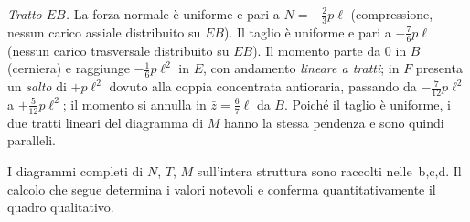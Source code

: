 \medskip
\noindent\textit{Tratto $EB$.}
La forza normale è uniforme e pari a
$N = -\tfrac{2}{3}p\ell$ (compressione, nessun carico
assiale distribuito su $EB$).
Il taglio è uniforme e pari a $-\tfrac{7}{6}p\ell$
(nessun carico trasversale distribuito su $EB$).
Il momento parte da $0$ in $B$ (cerniera)
e raggiunge $-\tfrac{1}{6}p\ell^2$ in $E$,
con andamento \emph{lineare a tratti}; in $F$
presenta un \emph{salto} di $+p\ell^2$ dovuto
alla coppia concentrata antioraria, passando
da $-\tfrac{7}{12}p\ell^2$ a $+\tfrac{5}{12}p\ell^2$;
il momento si annulla in $\bar{z} = \tfrac{6}{7}\ell$
da $B$. Poiché il taglio è uniforme, i due tratti
lineari del diagramma di $M$ hanno la stessa pendenza
e sono quindi paralleli.

I diagrammi completi di $N$, $T$, $M$ sull'intera
struttura sono raccolti nelle \,b,c,d.
Il calcolo che segue determina i valori notevoli
e conferma quantitativamente il quadro qualitativo.

